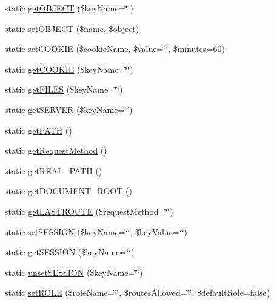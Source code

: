 \begin{DoxyCompactItemize}
\item 
static \hyperlink{classRuth_a899c68457a6a7c1b8a0b25bfd74c4c15}{get\+O\+B\+J\+E\+C\+T} (\$key\+Name=\char`\"{}\char`\"{})
\item 
static \hyperlink{classRuth_a9d554d9bdfe7596d41a2b08a3c0db9ce}{set\+O\+B\+J\+E\+C\+T} (\$name, \$\hyperlink{Shape_8php_a774642dc290de09e3aff55c8b594113f}{object})
\item 
static \hyperlink{classRuth_a971920e4c13f4e16bc8d72379804c16f}{set\+C\+O\+O\+K\+I\+E} (\$cookie\+Name, \$value=\char`\"{}\char`\"{}, \$minutes=60)
\item 
static \hyperlink{classRuth_a5ec6c65c94d056a2e0705efaa56f7660}{get\+C\+O\+O\+K\+I\+E} (\$key\+Name=\char`\"{}\char`\"{})
\item 
static \hyperlink{classRuth_a12be6f40ae06f4443848d0f8a089bd00}{get\+F\+I\+L\+E\+S} (\$key\+Name=\char`\"{}\char`\"{})
\item 
static \hyperlink{classRuth_ab868231ae3b29da9c9456d0b866dc8ec}{get\+S\+E\+R\+V\+E\+R} (\$key\+Name=\char`\"{}\char`\"{})
\item 
static \hyperlink{classRuth_abbbe520ef7554c895ab5f4213b8738a3}{get\+P\+A\+T\+H} ()
\item 
static \hyperlink{classRuth_addf8374cf72e378cb70c9cedeca62988}{get\+Request\+Method} ()
\item 
static \hyperlink{classRuth_a258953d4afe38d92f4be70313d500d40}{get\+R\+E\+A\+L\+\_\+\+P\+A\+T\+H} ()
\item 
static \hyperlink{classRuth_a0801b3a28f3385eeee817a3deb14b028}{get\+D\+O\+C\+U\+M\+E\+N\+T\+\_\+\+R\+O\+O\+T} ()
\item 
static \hyperlink{classRuth_a692691e58b9b2fce80e0bed5a3207137}{get\+L\+A\+S\+T\+R\+O\+U\+T\+E} (\$request\+Method=\char`\"{}\char`\"{})
\item 
static \hyperlink{classRuth_a4a88a74e5af0a0155eb3fe438ad995c3}{set\+S\+E\+S\+S\+I\+O\+N} (\$key\+Name=\char`\"{}\char`\"{}, \$key\+Value=\char`\"{}\char`\"{})
\item 
static \hyperlink{classRuth_a0960ac91d1a1ce9c7cb3324ee51f4d74}{get\+S\+E\+S\+S\+I\+O\+N} (\$key\+Name=\char`\"{}\char`\"{})
\item 
static \hyperlink{classRuth_a4f4e6184de654b141a679146e35f8f59}{unset\+S\+E\+S\+S\+I\+O\+N} (\$key\+Name=\char`\"{}\char`\"{})
\item 
static \hyperlink{classRuth_a169d4a654420b5abce66787cc8cb51b4}{set\+R\+O\+L\+E} (\$role\+Name=\char`\"{}\char`\"{}, \$routes\+Allowed=\char`\"{}\char`\"{}, \$default\+Role=false)

\end{DoxyCompactItemize}
